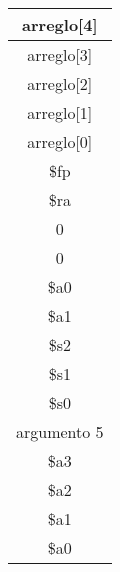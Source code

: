 \documentclass{article}
\begin{document}
\begin{table}[htbp]
\begin{center}
\begin{tabular}{|c|}
\hline
arreglo[4] \\ \hline
arreglo[3] \\ \hline
arreglo[2] \\ \hline
arreglo[1] \\ \hline
arreglo[0] \\ \hline
\$fp \\ \hline
\$ra \\ \hline
0 \\ \hline
0 \\ \hline
\$a0 \\ \hline
\$a1 \\
\hline \hline
\$s2 \\ \hline
\$s1 \\ \hline
\$s0 \\ \hline
argumento 5 \\ \hline
\$a3 \\ \hline
\$a2 \\ \hline
\$a1 \\ \hline
\$a0 \\ \hline
\end{tabular}
\end{center}
\end{table}
\end{document}
